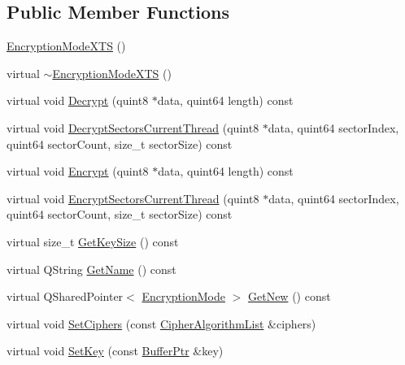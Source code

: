 \subsection*{Public Member Functions}
\begin{DoxyCompactItemize}
\item 
\hyperlink{class_gost_crypt_1_1_volume_1_1_encryption_mode_x_t_s_aec865043f40cb3aff76e0254df5fec93}{Encryption\+Mode\+X\+TS} ()
\item 
virtual \hyperlink{class_gost_crypt_1_1_volume_1_1_encryption_mode_x_t_s_aacfd9128c1ac77fb86497c95f435a7a5}{$\sim$\+Encryption\+Mode\+X\+TS} ()
\item 
virtual void \hyperlink{class_gost_crypt_1_1_volume_1_1_encryption_mode_x_t_s_ae4557cb0886484ee37783f56561e7edd}{Decrypt} (quint8 $\ast$data, quint64 length) const
\item 
virtual void \hyperlink{class_gost_crypt_1_1_volume_1_1_encryption_mode_x_t_s_a391a08eb12f92d855ac49dd3e7fddaf0}{Decrypt\+Sectors\+Current\+Thread} (quint8 $\ast$data, quint64 sector\+Index, quint64 sector\+Count, size\+\_\+t sector\+Size) const
\item 
virtual void \hyperlink{class_gost_crypt_1_1_volume_1_1_encryption_mode_x_t_s_a2802c291ee815c9ed2280aa1498d7afb}{Encrypt} (quint8 $\ast$data, quint64 length) const
\item 
virtual void \hyperlink{class_gost_crypt_1_1_volume_1_1_encryption_mode_x_t_s_ad51337408f2e52afdd18491429fb6ea6}{Encrypt\+Sectors\+Current\+Thread} (quint8 $\ast$data, quint64 sector\+Index, quint64 sector\+Count, size\+\_\+t sector\+Size) const
\item 
virtual size\+\_\+t \hyperlink{class_gost_crypt_1_1_volume_1_1_encryption_mode_x_t_s_a01604711469ba3dc601b0589a4fdee3e}{Get\+Key\+Size} () const
\item 
virtual Q\+String \hyperlink{class_gost_crypt_1_1_volume_1_1_encryption_mode_x_t_s_a3e4b43e1295accb96021b03deaa5e7b1}{Get\+Name} () const
\item 
virtual Q\+Shared\+Pointer$<$ \hyperlink{class_gost_crypt_1_1_volume_1_1_encryption_mode}{Encryption\+Mode} $>$ \hyperlink{class_gost_crypt_1_1_volume_1_1_encryption_mode_x_t_s_a3d9c88420585ed76c1c11f541db973e1}{Get\+New} () const
\item 
virtual void \hyperlink{class_gost_crypt_1_1_volume_1_1_encryption_mode_x_t_s_a053dbb2201d89cc400416b63c57787de}{Set\+Ciphers} (const \hyperlink{namespace_gost_crypt_1_1_volume_ad32c730cdf3a63d2bafbac0f63f0740f}{Cipher\+Algorithm\+List} \&ciphers)
\item 
virtual void \hyperlink{class_gost_crypt_1_1_volume_1_1_encryption_mode_x_t_s_a730bb23e5adffa958904aa91cacc8b74}{Set\+Key} (const \hyperlink{class_gost_crypt_1_1_buffer_ptr}{Buffer\+Ptr} \&key)
\end{DoxyCompactItemize}

